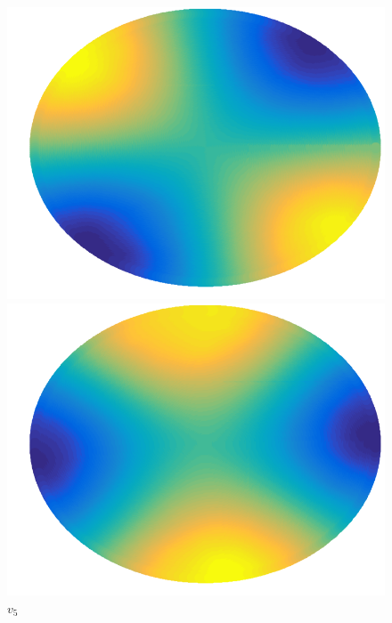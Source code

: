 \documentclass{beamer}
\begin{document}
\begin{frame}
\begin{figure}
\begin{minipage}[b]{0.18\linewidth}
      \caption{\tiny $v_3$}
    \end{minipage}
    \hfill
    \begin{minipage}[b]{0.18\linewidth}
      \centering
      \includegraphics[width=\textwidth]{./Images/DiscExample/ManifoldLaplacian/evec04.png}
      \caption{\tiny $v_4$}
    \end{minipage}
    \hfill
    \begin{minipage}[b]{0.18\linewidth}
      \centering
      \includegraphics[width=\textwidth]{./Images/DiscExample/ManifoldLaplacian/evec05.png}
      \caption{\tiny $v_5$}
    \end{minipage}
    \hfill
    \begin{minipage}[b]{0.18\linewidth}

\end{minipage}
\end{figure}
\end{frame}
\end{document}
